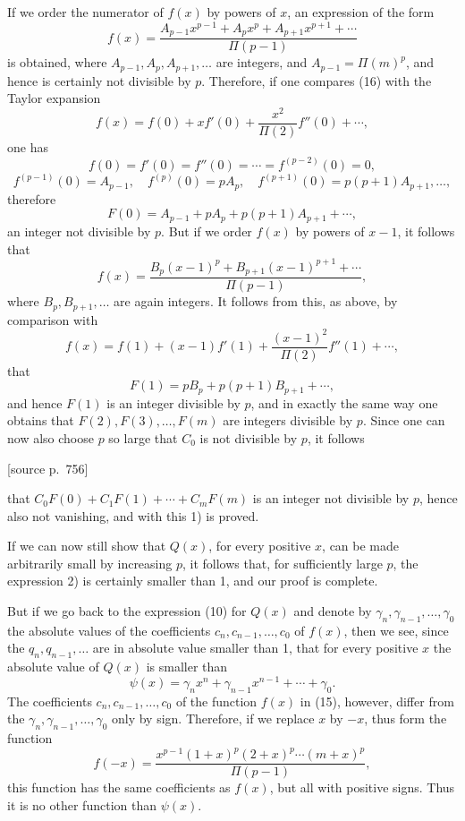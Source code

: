 \documentclass[11pt]{article}
\newcommand{\srcpage}[1]{\par\medskip\noindent\textsf{[source p.~#1]}\par\smallskip}
\begin{document}
If we order the numerator of $f(x)$ by powers of $x$, an expression of the form
\begin{equation}\tag{16}
f(x)=\frac{A_{p-1}x^{p-1}+A_px^p+A_{p+1}x^{p+1}+\cdots}{\Pi(p-1)}
\end{equation}
is obtained, where $A_{p-1},A_p,A_{p+1},\ldots$ are integers, and $A_{p-1}=\Pi(m)^p$, and hence is certainly not divisible by $p$. Therefore, if one compares (16) with the Taylor expansion
\[
f(x)=f(0)+xf'(0)+\frac{x^2}{\Pi(2)}f''(0)+\cdots,
\]
one has
\[
f(0)=f'(0)=f''(0)=\cdots=f^{(p-2)}(0)=0,
\]
\[
f^{(p-1)}(0)=A_{p-1},\quad f^{(p)}(0)=pA_p,\quad
f^{(p+1)}(0)=p(p+1)A_{p+1},\ldots,
\]
therefore
\[
F(0)=A_{p-1}+pA_p+p(p+1)A_{p+1}+\cdots,
\]
an integer not divisible by $p$. But if we order $f(x)$ by powers of $x-1$, it follows that
\[
f(x)=\frac{B_p(x-1)^p+B_{p+1}(x-1)^{p+1}+\cdots}{\Pi(p-1)},
\]
where $B_p,B_{p+1},\ldots$ are again integers. It follows from this, as above, by comparison with
\[
f(x)=f(1)+(x-1)f'(1)+\frac{(x-1)^2}{\Pi(2)}f''(1)+\cdots,
\]
that
\[
F(1)=pB_p+p(p+1)B_{p+1}+\cdots,
\]
and hence $F(1)$ is an integer divisible by $p$, and in exactly the same way one obtains that $F(2),F(3),\ldots,F(m)$ are integers divisible by $p$. Since one can now also choose $p$ so large that $C_0$ is not divisible by $p$, it follows

\srcpage{756}
that $C_0F(0)+C_1F(1)+\cdots+C_mF(m)$ is an integer not divisible by $p$, hence also not vanishing, and with this 1) is proved.

If we can now still show that $Q(x)$, for every positive $x$, can be made arbitrarily small by increasing $p$, it follows that, for sufficiently large $p$, the expression 2) is certainly smaller than 1, and our proof is complete.

But if we go back to the expression (10) for $Q(x)$ and denote by $\gamma_n,\gamma_{n-1},\ldots,\gamma_0$ the absolute values of the coefficients $c_n,c_{n-1},\ldots,c_0$ of $f(x)$, then we see, since the $q_n,q_{n-1},\ldots$ are in absolute value smaller than 1, that for every positive $x$ the absolute value of $Q(x)$ is smaller than
\begin{equation}\tag{17}
\psi(x)=\gamma_nx^n+\gamma_{n-1}x^{n-1}+\cdots+\gamma_0.
\end{equation}
The coefficients $c_n,c_{n-1},\ldots,c_0$ of the function $f(x)$ in (15), however, differ from the $\gamma_n,\gamma_{n-1},\ldots,\gamma_0$ only by sign. Therefore, if we replace $x$ by $-x$, thus form the function
\[
f(-x)=\frac{x^{p-1}(1+x)^p(2+x)^p\cdots(m+x)^p}{\Pi(p-1)},
\]
this function has the same coefficients as $f(x)$, but all with positive signs. Thus it is no other function than $\psi(x)$.
\end{document}
